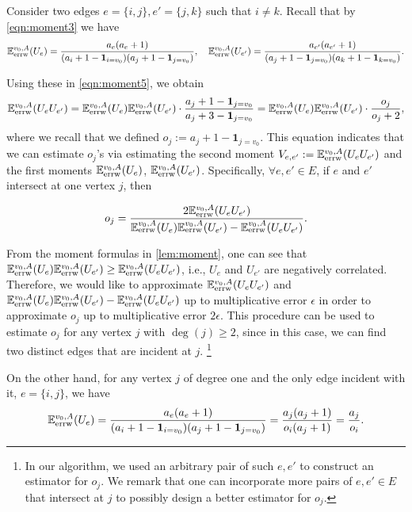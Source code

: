 \documentclass[a4paper, 11pt]{article}
\newcommand{\E}{\mathbb{E}}
\newcommand{\Eerrw}{\E_{\textnormal{errw}}}
\newcommand{\ind}{\mathbf{1}}
\newcommand{\covar}{\textnormal{Cov}}
\begin{document}
Consider two edges $e=\{i,j\}, e'=\{j,k\}$ such that $i\neq k$. Recall that by \cref{eqn:moment3} we have
\[\Eerrw^{v_0,A} (U_e)=\frac{a_e(a_e+1)}{(a_i+1-\ind_{i=v_0})(a_j+1-\ind_{j=v_0})},\quad \Eerrw^{v_0,A} (U_{e'})=\frac{a_{e'}(a_{e'}+1)}{(a_j+1-\ind_{j=v_0})(a_k+1-\ind_{k=v_0})}.\]

Using these in \cref{eqn:moment5}, we obtain
\[\Eerrw^{v_0,A} (U_eU_{e'})=\Eerrw^{v_0,A} (U_e)\Eerrw^{v_0,A} (U_{e'})\cdot \frac{a_j+1-\ind_{j=v_0}}{a_j+3-\ind_{j=v_0}}=\Eerrw^{v_0,A} (U_e)\Eerrw^{v_0,A} (U_{e'})\cdot \frac{o_j}{o_j+2}, \]
where we
recall that we defined $o_j:=a_j+1-\ind_{j=v_0}$. This equation indicates that we can estimate $o_j$'s via estimating the second moment $V_{e,e'}:=\Eerrw^{v_0,A} (U_eU_{e'})$ and the first moments $\Eerrw^{v_0,A}(U_e)$, $\Eerrw^{v_0,A} (U_{e'})$. Specifically, $\forall e,e'\in E$, if $e$ and $e'$ intersect at one vertex $j$, then

\begin{equation}
\label{eqn:degtwo}
o_j=\frac{2\Eerrw^{v_0,A} (U_eU_{e'})}{\Eerrw^{v_0,A}(U_e)\Eerrw^{v_0,A} (U_{e'})-\Eerrw^{v_0,A} (U_eU_{e'})}.
\end{equation}

From the moment formulas in \cref{lem:moment}, one can see that $\Eerrw^{v_0,A}(U_e)\Eerrw^{v_0,A} (U_{e'})\geq \Eerrw^{v_0,A} (U_eU_{e'})$, i.e., $U_e$ and $U_{e'}$ are negatively correlated.
Therefore, we would like to approximate $\Eerrw^{v_0,A} (U_eU_{e'})$ and $\Eerrw^{v_0,A}(U_e)\Eerrw^{v_0,A} (U_{e'})-\Eerrw^{v_0,A} (U_eU_{e'})$ up to multiplicative error $\epsilon$ in order to approximate $o_j$ up to multiplicative error $2\epsilon$. This procedure can be used to estimate $o_j$ for any vertex $j$ with $\deg(j)\geq 2$, since in this case, we can find two distinct edges that are incident at $j$.
\footnote{In our algorithm, we used an arbitrary pair of such $e,e'$ to construct an estimator for $o_j$. We remark that one can incorporate more pairs of $e,e'\in E$ that intersect at $j$ to possibly design a better estimator for $o_j$.}

On the other hand, for any vertex $j$ of degree one and the only edge incident with it, $e=\{i,j\}$, we have 
\begin{equation*}
\Eerrw^{v_0,A}(U_e)=\frac{a_e(a_e+1)}{(a_i+1-\ind_{i=v_0})(a_j+1-\ind_{j=v_0})}=\frac{a_j(a_j+1)}{o_i(a_j+1)}=\frac{a_j}{o_i}.
\end{equation*}
\end{document}
